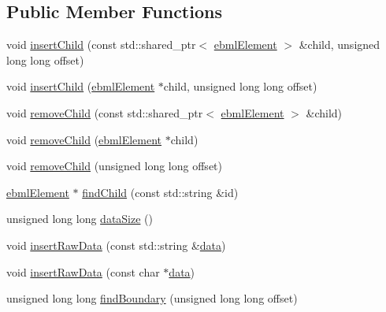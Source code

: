 \subsection*{Public Member Functions}
\begin{DoxyCompactItemize}
\item 
void \mbox{\hyperlink{classebml_1_1ebmlLazyLoadMasterElement_ad2cdaaaf405504656dba80141161d408}{insert\+Child}} (const std\+::shared\+\_\+ptr$<$ \mbox{\hyperlink{classebml_1_1ebmlElement}{ebml\+Element}} $>$ \&child, unsigned long long offset)
\item 
void \mbox{\hyperlink{classebml_1_1ebmlLazyLoadMasterElement_abfccb91f9bfc5df01ca69e274e712200}{insert\+Child}} (\mbox{\hyperlink{classebml_1_1ebmlElement}{ebml\+Element}} $\ast$child, unsigned long long offset)
\item 
void \mbox{\hyperlink{classebml_1_1ebmlLazyLoadMasterElement_a6adedb56aa90f72de79fd9fbb0c4453e}{remove\+Child}} (const std\+::shared\+\_\+ptr$<$ \mbox{\hyperlink{classebml_1_1ebmlElement}{ebml\+Element}} $>$ \&child)
\item 
void \mbox{\hyperlink{classebml_1_1ebmlLazyLoadMasterElement_ab9ceadb087d706222b2167f4c29dfe0e}{remove\+Child}} (\mbox{\hyperlink{classebml_1_1ebmlElement}{ebml\+Element}} $\ast$child)
\item 
void \mbox{\hyperlink{classebml_1_1ebmlLazyLoadMasterElement_ac068afeec4ce0913d6ac94e834bdf79b}{remove\+Child}} (unsigned long long offset)
\item 
\mbox{\hyperlink{classebml_1_1ebmlElement}{ebml\+Element}} $\ast$ \mbox{\hyperlink{classebml_1_1ebmlLazyLoadMasterElement_a6c16e41f5d26f4a7069bbfebd3fe918e}{find\+Child}} (const std\+::string \&id)
\item 
unsigned long long \mbox{\hyperlink{classebml_1_1ebmlLazyLoadMasterElement_a85e983901d2d66f042b803a62664d725}{data\+Size}} ()
\item 
void \mbox{\hyperlink{classebml_1_1ebmlLazyLoadMasterElement_ab65656adb28c62ff88dd69b804648c90}{insert\+Raw\+Data}} (const std\+::string \&\mbox{\hyperlink{namespaceebml_a6365629b3110a3c5d0cde94d08aac26c}{data}})
\item 
void \mbox{\hyperlink{classebml_1_1ebmlLazyLoadMasterElement_ad85a4bc21582fe54cd907a70423ecd6a}{insert\+Raw\+Data}} (const char $\ast$\mbox{\hyperlink{namespaceebml_a6365629b3110a3c5d0cde94d08aac26c}{data}})
\item 
unsigned long long \mbox{\hyperlink{classebml_1_1ebmlLazyLoadMasterElement_a85240c360b1fbdffb734cd55ac0ede0f}{find\+Boundary}} (unsigned long long offset)

\end{DoxyCompactItemize}
